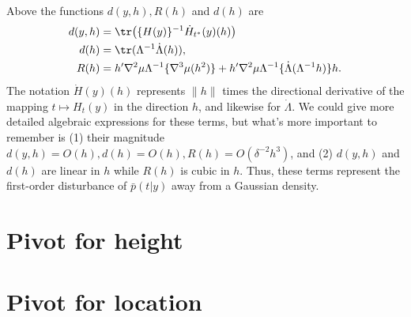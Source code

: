\documentclass{article}
\newcommand{\ag}[1]{{\bf{{\red{[{AG: #1}]}}}}}
\begin{document}
Above the functions $d(y,h), R(h)$ and $d(h)$ are
\begin{equation}
\begin{aligned}
	\label{eqn:first-order}
	d(y,h) & = \tr\big(\{H(y)\}^{-1} \dot{H}_{t^*}(y)(h)\big) \\
	d(h) & = \tr(\Lambda^{-1} \dot{\Lambda}(h)), \\
	R(h) & = h' \nabla^2 \mu \Lambda^{-1} \{\nabla^3\mu(h^2)\} +  h'\nabla^2 \mu \Lambda^{-1}\{\dot{\Lambda}(\Lambda^{-1}h)\} h.
\end{aligned}
\end{equation}
The notation $\dot{H}(y)(h)$ represents $\|h\|$ times the directional derivative of the mapping $t \mapsto H_t(y)$ in the direction $h$, and likewise for $\dot{\Lambda}$. We could give more detailed algebraic expressions for these terms, but what's more important to remember is (1) their magnitude $d(y,h) = O(h), d(h) = O(h), R(h) = O(\delta^{-2}h^3)$, and (2) $d(y,h)$ and $d(h)$ are linear in $h$ while $R(h)$ is cubic in $h$. Thus, these terms represent the first-order disturbance of $\bar{p}(t|y)$ away from a Gaussian density. 

\section{Pivot for height}
\ag{TO COME}

\section{Pivot for location}
\end{document}
